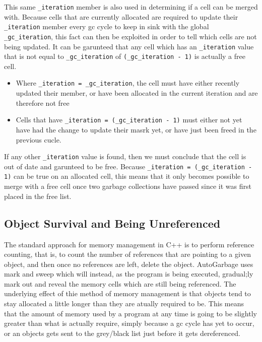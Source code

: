 \documentclass[11pt]{article}
\begin{document}
\begin{enumerate}
This same \texttt{\_iteration} member is also used in determining if a cell can be merged with. Because cells that are currently 
allocated are required to update their \texttt{\_iteration} member every gc cycle to keep in sink with the global
\texttt{\_gc\_iteration}, this fact can then be exploited in order to tell which cells are not being updated. It can
be garunteed that any cell which has an \texttt{\_iteration} value that is not equal to \texttt{\_gc\_iteration}
of \texttt{(\_gc\_iteration - 1)} is actually a free cell.
\begin{itemize}
\item Where \texttt{\_iteration = \_gc\_iteration}, the cell must have either recently updated their member, or have
been allocated in the current iteration and are therefore not free
\item Cells that have \texttt{\_iteration = (\_gc\_iteration - 1)} must either not yet have had the change to update their masrk
yet, or have just been freed in the previous cucle.
\end{itemize}

If any other \texttt{\_iteration} value is found, then we must conclude that the cell is out of date and garunteed to be free.
Because \texttt{\_iteration = (\_gc\_iteration - 1)} can be true on an allocated cell, this means that it only becomes possible
to merge with a free cell once two garbage collections have passed since it was first placed in the free list.
\end{enumerate}

\subsection{Object Survival and Being Unreferenced}
The standard approach for memory management in C++ is to perform reference counting, that is, to count the number of 
references that are pointing to a given object, and then once no references are left, delete the object. AutoGarbage uses
mark and sweep which will instead, as the program is being executed, gradual;ly mark out and reveal the memory cells which are still
being referenced.
The underlying effect of thie method of memory management is that objects tend to stay allocated a little longer than they 
are atually required to be. This means that the amount of memory used by a program at any time is going to be slightly greater
than what is actually require, simply because a gc cycle has yet to occur, or an objects gets sent to the grey/black list 
just before it gets dereferenced.
\end{document}
